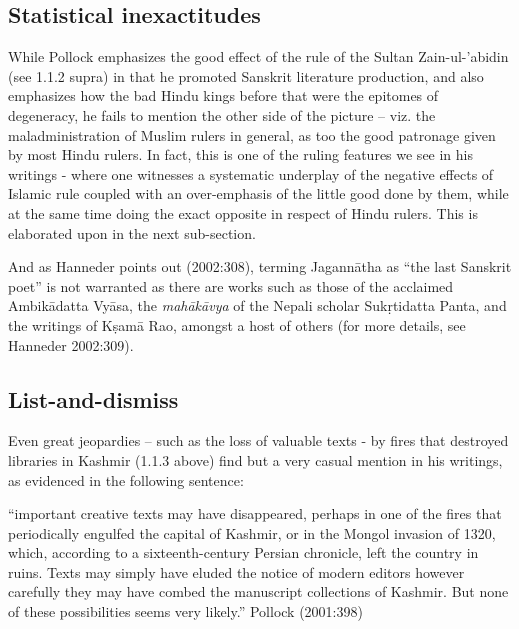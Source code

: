 \subsection{Statistical inexactitudes}

While Pollock emphasizes the good effect of the rule of the Sultan Zain-ul-'abidin (see 1.1.2 supra) in that he promoted Sanskrit literature production, and also emphasizes how the bad Hindu kings before that were the epitomes of degeneracy, he fails to mention the other side of the picture – viz. the maladministration of Muslim rulers in general, as too the good patronage given by most Hindu rulers. In fact, this is one of the ruling features we see in his writings - where one witnesses a systematic underplay of the negative effects of Islamic rule coupled with an over-emphasis of  the little good done by them, while at the same time doing the exact opposite in respect of Hindu rulers. This is elaborated upon in the next sub-section.

And as Hanneder points out (2002:308), terming Jagannātha as “the last Sanskrit poet” is not warranted as there are works such as those of the acclaimed Ambikādatta Vyāsa, the {\sl mahākāvya} of the Nepali scholar Sukṛtidatta Panta, and the writings of Kṣamā Rao, amongst a host of others (for more details, see Hanneder 2002:309).

\subsection{List-and-dismiss}

Even great jeopardies – such as the loss of valuable texts - by fires that destroyed libraries in Kashmir (1.1.3 above) find but a very casual mention in his writings, as evidenced in the following sentence:
\begin{myquote}
\eleven
“important creative texts may have disappeared, perhaps in one of the fires that periodically engulfed the capital of Kashmir, or in the Mongol invasion of 1320, which, according to a sixteenth-century Persian chronicle, left the country in ruins. Texts may simply have eluded the notice of modern editors however carefully they may have combed the manuscript collections of Kashmir. But none of these possibilities seems very likely.”	\hfill Pollock (2001:398)
\end{myquote}

